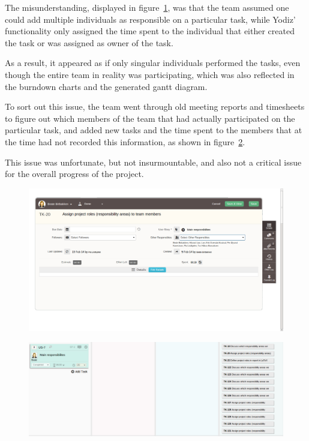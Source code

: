 The misunderstanding, displayed in figure~\ref{fig:wrongUse}, was that the team assumed one could add multiple individuals as responsible on a particular task, while Yodiz' functionality only assigned the time spent to the individual that either created the task or was assigned as owner of the task.

As a result, it appeared as if only singular individuals performed the tasks, even though the entire team in reality was participating, which was also reflected in the burndown charts and the generated gantt diagram. 

To sort out this issue, the team went through old meeting reports and timesheets to figure out which members of the team that had actually participated on the particular task, and added new tasks and the time spent to the members that at the time had not recorded this information, as shown in figure~\ref{fig:addsTasks}.

This issue was unfortunate, but not insurmountable, and also not a critical issue for the overall progress of the project.

\begin{figure}[H]
\includegraphics[width=\textwidth]{ch/sprints/fig/wrongUse.png}
\label{fig:wrongUse}
\end{figure}

\begin{figure}[H]
\includegraphics[width=\textwidth]{ch/sprints/fig/addsTasks.png}
\label{fig:addsTasks}
\end{figure}


